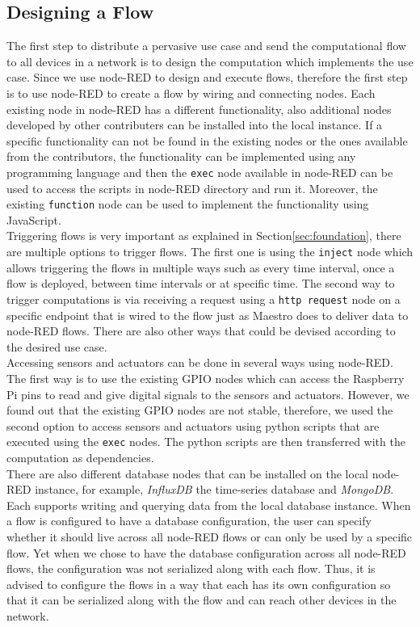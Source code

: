 \subsection{Designing a Flow}
The first step to distribute a pervasive use case and send the computational flow to all devices in a network is to design the computation which implements the use case. Since we use node-RED to design and execute flows, therefore the first step is to use node-RED to create a flow by wiring and connecting nodes. Each existing node in node-RED has a different functionality, also additional nodes developed by other contributers can be installed into the local instance. If a specific functionality can not be found  in the existing nodes or the ones available from the contributors, the functionality can be implemented using any programming language and then  the \verb|exec| node available in node-RED can be used to access the scripts in node-RED directory and run it. Moreover, the  existing \verb|function| node can be used to implement the functionality using  JavaScript. \\

\noindent Triggering flows is very important as explained in Section\ref{sec:foundation}, there are multiple options to trigger flows. The first one is using the \verb|inject| node which allows  triggering the flows in multiple ways such as every time interval, once a flow is deployed, between time intervals or at specific time. The second way to trigger computations is via receiving a request using a \verb|http request| node on a specific endpoint that is wired to the flow just as Maestro does to deliver data to node-RED flows. There are also other ways that could be devised according to the desired use case.\\
 

\noindent Accessing sensors and actuators can be done in several ways using node-RED. The first way is to use the existing GPIO nodes which can access the Raspberry Pi pins to read  and give digital signals to the sensors and actuators. However, we found out that the existing GPIO nodes are not stable, therefore, we used the second option to access sensors and actuators using python scripts that are executed using the \verb|exec| nodes. The python scripts are then transferred with the computation as  dependencies.\\

\noindent There are also different  database nodes that can be installed on the local node-RED instance, for example, \textit{InfluxDB} the time-series database and \textit{MongoDB}. Each supports writing and querying data from the local database instance. When a flow is configured to have a database configuration, the user can specify whether it should live across all node-RED flows or can  only be used by a specific flow.  Yet when we chose to have the database configuration across all node-RED flows, the configuration was not serialized along with each flow. Thus, it is advised to configure the flows in a way that each has its own configuration so that it can be serialized along with the flow and can reach other devices in the network.\\


